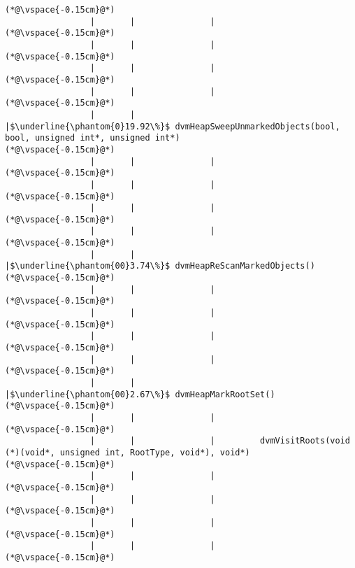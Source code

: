 \begin{lstlisting}
(*@\vspace{-0.15cm}@*)
                 |       |               |        
(*@\vspace{-0.15cm}@*)
                 |       |               |        
(*@\vspace{-0.15cm}@*)
                 |       |               |
(*@\vspace{-0.15cm}@*)
                 |       |               |
(*@\vspace{-0.15cm}@*)
                 |       |               |$\underline{\phantom{0}19.92\%}$ dvmHeapSweepUnmarkedObjects(bool, bool, unsigned int*, unsigned int*)
(*@\vspace{-0.15cm}@*)
                 |       |               |        
(*@\vspace{-0.15cm}@*)
                 |       |               |        
(*@\vspace{-0.15cm}@*)
                 |       |               |
(*@\vspace{-0.15cm}@*)
                 |       |               |
(*@\vspace{-0.15cm}@*)
                 |       |               |$\underline{\phantom{00}3.74\%}$ dvmHeapReScanMarkedObjects()
(*@\vspace{-0.15cm}@*)
                 |       |               |        
(*@\vspace{-0.15cm}@*)
                 |       |               |        
(*@\vspace{-0.15cm}@*)
                 |       |               |
(*@\vspace{-0.15cm}@*)
                 |       |               |
(*@\vspace{-0.15cm}@*)
                 |       |               |$\underline{\phantom{00}2.67\%}$ dvmHeapMarkRootSet()
(*@\vspace{-0.15cm}@*)
                 |       |               |
(*@\vspace{-0.15cm}@*)
                 |       |               |         dvmVisitRoots(void (*)(void*, unsigned int, RootType, void*), void*)
(*@\vspace{-0.15cm}@*)
                 |       |               |        
(*@\vspace{-0.15cm}@*)
                 |       |               |        
(*@\vspace{-0.15cm}@*)
                 |       |               |
(*@\vspace{-0.15cm}@*)
                 |       |               |
(*@\vspace{-0.15cm}@*)

\end{lstlisting}
